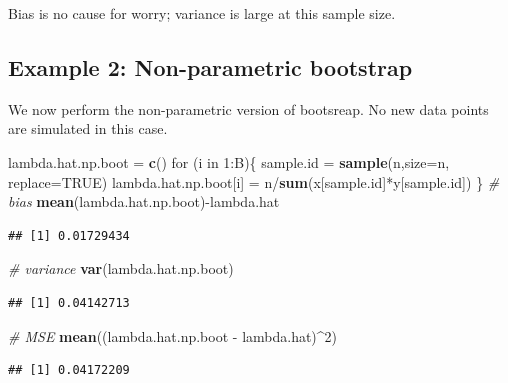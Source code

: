 \documentclass[]{article}
\newenvironment{Shaded}{\begin{snugshade}}{\end{snugshade}}
\newcommand{\KeywordTok}[1]{\textcolor[rgb]{0.13,0.29,0.53}{\textbf{{#1}}}}
\newcommand{\DataTypeTok}[1]{\textcolor[rgb]{0.13,0.29,0.53}{{#1}}}
\newcommand{\DecValTok}[1]{\textcolor[rgb]{0.00,0.00,0.81}{{#1}}}
\newcommand{\StringTok}[1]{\textcolor[rgb]{0.31,0.60,0.02}{{#1}}}
\newcommand{\CommentTok}[1]{\textcolor[rgb]{0.56,0.35,0.01}{\textit{{#1}}}}
\newcommand{\OtherTok}[1]{\textcolor[rgb]{0.56,0.35,0.01}{{#1}}}
\newcommand{\NormalTok}[1]{{#1}}
\begin{document}
Bias is no cause for worry; variance is large at this sample size.

\subsection{Example 2: Non-parametric
bootstrap}\label{example-2-non-parametric-bootstrap}

We now perform the non-parametric version of bootsreap. No new data
points are simulated in this case.

\begin{Shaded}
\begin{Highlighting}[]
\NormalTok{lambda.hat.np.boot =}\StringTok{ }\KeywordTok{c}\NormalTok{() }
\NormalTok{for (i in }\DecValTok{1}\NormalTok{:B)\{}
    \NormalTok{sample.id =}\StringTok{ }\KeywordTok{sample}\NormalTok{(n,}\DataTypeTok{size=}\NormalTok{n, }\DataTypeTok{replace=}\OtherTok{TRUE}\NormalTok{)}
    \NormalTok{lambda.hat.np.boot[i] =}\StringTok{ }\NormalTok{n/}\KeywordTok{sum}\NormalTok{(x[sample.id]*y[sample.id])}
\NormalTok{\}}
\CommentTok{# bias}
\KeywordTok{mean}\NormalTok{(lambda.hat.np.boot)-lambda.hat}
\end{Highlighting}
\end{Shaded}

\begin{verbatim}
## [1] 0.01729434
\end{verbatim}

\begin{Shaded}
\begin{Highlighting}[]
\CommentTok{# variance}
\KeywordTok{var}\NormalTok{(lambda.hat.np.boot)}
\end{Highlighting}
\end{Shaded}

\begin{verbatim}
## [1] 0.04142713
\end{verbatim}

\begin{Shaded}
\begin{Highlighting}[]
\CommentTok{# MSE}
\KeywordTok{mean}\NormalTok{((lambda.hat.np.boot -}\StringTok{ }\NormalTok{lambda.hat)^}\DecValTok{2}\NormalTok{)}
\end{Highlighting}
\end{Shaded}

\begin{verbatim}
## [1] 0.04172209
\end{verbatim}
\end{document}

